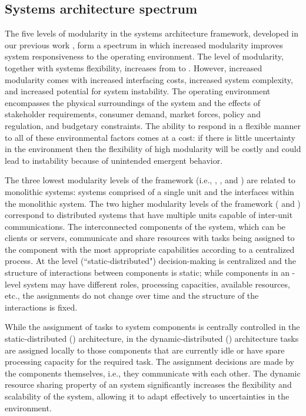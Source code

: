 \documentclass[journal,onecolumn]{IEEEtran}
\theoremstyle{plain}
\begin{document}
\subsection{Systems architecture spectrum}
The five levels of modularity in the systems architecture framework, developed in our previous work \citep{heydari2014,mosleh2015monolithic}, form a spectrum in which increased modularity improves system responsiveness to the operating environment. The level of modularity, together with systems flexibility, increases from  to . However, increased modularity comes with increased interfacing costs, increased system complexity, and increased potential for system instability. The operating environment encompasses the physical surroundings of the system and the effects of stakeholder requirements, consumer demand, market forces, policy and regulation, and budgetary constraints. The ability to respond in a flexible manner to all of these environmental factors comes at a cost: if there is little uncertainty in the environment then the flexibility of high modularity will be costly and could lead to instability because of unintended emergent behavior.

The three lowest modularity levels of the framework (i.e., , , and ) are related to monolithic systems: systems comprised of a single unit and the interfaces within the monolithic system. The two higher modularity levels of the framework ( and ) correspond to distributed systems that have multiple units capable of inter-unit communications. The interconnected components of the  system, which can be clients or servers, communicate and share resources with tasks being assigned to the component with the most appropriate capabilities according to a centralized process.  At the  level (``static-distributed") decision-making is centralized and the structure of interactions between components is static; while components in an -level system may have different roles, processing capacities, available resources, etc., the assignments do not change over time and the structure of the interactions is fixed. 

While the assignment of tasks to system components is centrally controlled in the static-distributed () architecture, in the dynamic-distributed () architecture tasks are assigned locally to those components that are currently idle or have spare processing capacity for the required task. The assignment decisions are made by the components themselves, i.e., they communicate with each other. The dynamic resource sharing property of an  system significantly increases the flexibility and scalability of the system, allowing it to adapt effectively to uncertainties in the environment.
\end{document}
